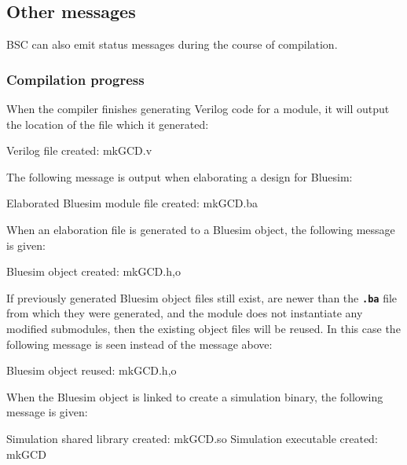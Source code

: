 \documentclass{article}
\newenvironment{centerboxverbatim}
  {\center
   \boxedverbatim}
  {\endboxedverbatim
  {\endcenter }}
\begin{document}

\subsection{Other messages}

BSC can also emit status messages during the course of compilation.


\subsubsection{Compilation progress}
\label{sec-progress-messages}

When the compiler finishes generating Verilog code for a module, it
will output the location of the file which it generated:

\begin{centerboxverbatim}
Verilog file created: mkGCD.v
\end{centerboxverbatim}

The following message is output when elaborating a design for Bluesim:

\begin{centerboxverbatim}
Elaborated Bluesim module file created: mkGCD.ba
\end{centerboxverbatim}

When an elaboration file is generated to a Bluesim object, the
following message is given:

\begin{centerboxverbatim}
Bluesim object created: mkGCD.{h,o}
\end{centerboxverbatim}

If previously generated Bluesim object files still exist, are newer
than the {\tt\bf .ba} file from which they were generated, and the
module does not instantiate any modified submodules, then the
existing object files will be reused.  In this case the following
message is seen instead of the message above:

\begin{centerboxverbatim}
Bluesim object reused: mkGCD.{h,o}
\end{centerboxverbatim}

When the Bluesim object is linked to create a simulation binary, the
following message is given:

\begin{centerboxverbatim}
Simulation shared library created: mkGCD.so
Simulation executable created: mkGCD
\end{centerboxverbatim}
\end{document}
